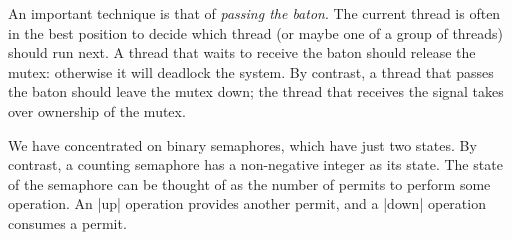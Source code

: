 An important technique is that of \emph{passing the baton}.  The current
thread is often in the best position to decide which thread (or maybe one of a
group of threads) should run next.  A thread that waits to receive the baton
should release the mutex: otherwise it will deadlock the system.  By contrast,
a thread that passes the baton should leave the mutex down; the thread that
receives the signal takes over ownership of the mutex.  

We have concentrated on binary semaphores, which have just two states.  By
contrast, a counting semaphore has a non-negative integer as its state.  The
state of the semaphore can be thought of as the number of permits to perform
some operation.  An |up| operation provides another permit, and a |down|
operation consumes a permit. 




\exercises









